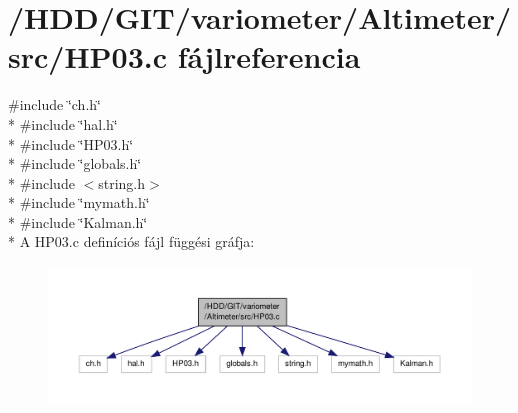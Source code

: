 \section{/\-H\-D\-D/\-G\-I\-T/variometer/\-Altimeter/src/\-H\-P03.c fájlreferencia}
\label{_h_p03_8c}
{\ttfamily \#include \char`\"{}ch.\-h\char`\"{}}\\*
{\ttfamily \#include \char`\"{}hal.\-h\char`\"{}}\\*
{\ttfamily \#include \char`\"{}H\-P03.\-h\char`\"{}}\\*
{\ttfamily \#include \char`\"{}globals.\-h\char`\"{}}\\*
{\ttfamily \#include $<$string.\-h$>$}\\*
{\ttfamily \#include \char`\"{}mymath.\-h\char`\"{}}\\*
{\ttfamily \#include \char`\"{}Kalman.\-h\char`\"{}}\\*
A H\-P03.\-c definíciós fájl függési gráfja\-:
\nopagebreak
\begin{figure}[H]
\begin{center}
\leavevmode
\includegraphics[width=350pt]{_h_p03_8c__incl}
\end{center}
\end{figure}

